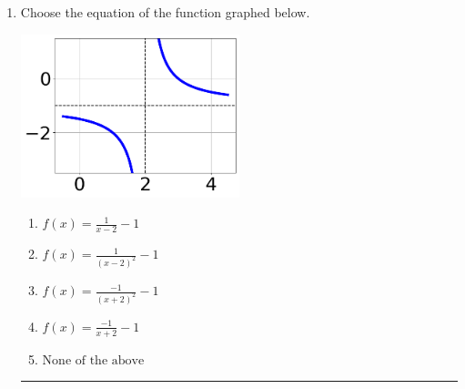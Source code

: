 \documentclass[14pt]{extbook}
\newcommand{\litem}[1]{\item#1\hspace*{-1cm}\rule{\textwidth}{0.4pt}}
\begin{document}
\begin{enumerate}
{\begin{enumerate}[label=\Alph*.]
\end{enumerate} }
\litem{
Choose the equation of the function graphed below.
\begin{center}
    \includegraphics[width=0.5\textwidth]{../Figures/rationalGraphToEquationCopyA.png}
\end{center}
\begin{enumerate}[label=\Alph*.]
\item \( f(x) = \frac{1}{x - 2} - 1 \)
\item \( f(x) = \frac{1}{(x - 2)^2} - 1 \)
\item \( f(x) = \frac{-1}{(x + 2)^2} - 1 \)
\item \( f(x) = \frac{-1}{x + 2} - 1 \)
\item \( \text{None of the above} \)


\end{enumerate}}
\end{enumerate}
\end{document}
